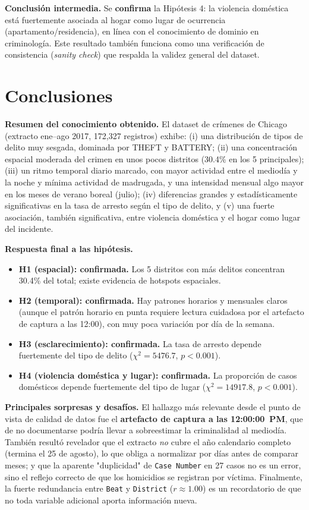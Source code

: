 \documentclass[11pt,a4paper]{article}
\begin{document}
\textbf{Conclusión intermedia.} Se \textbf{confirma} la Hipótesis 4: la
violencia doméstica está fuertemente asociada al hogar como lugar de
ocurrencia (apartamento/residencia), en línea con el conocimiento de
dominio en criminología. Este resultado también funciona como una
verificación de consistencia (\textit{sanity check}) que respalda la
validez general del dataset.

\section{Conclusiones}

\textbf{Resumen del conocimiento obtenido.} El dataset de crímenes de
Chicago (extracto ene--ago 2017, 172,327 registros) exhibe: (i) una
distribución de tipos de delito muy sesgada, dominada por THEFT y BATTERY;
(ii) una concentración espacial moderada del crimen en unos pocos distritos
(30.4\% en los 5 principales); (iii) un ritmo temporal diario marcado, con
mayor actividad entre el mediodía y la noche y mínima actividad de
madrugada, y una intensidad mensual algo mayor en los meses de verano
boreal (julio); (iv) diferencias grandes y estadísticamente significativas
en la tasa de arresto según el tipo de delito, y (v) una fuerte asociación,
también significativa, entre violencia doméstica y el hogar como lugar del
incidente.

\textbf{Respuesta final a las hipótesis.}
\begin{itemize}
    \item \textbf{H1 (espacial): confirmada.} Los 5 distritos con más
    delitos concentran 30.4\% del total; existe evidencia de hotspots
    espaciales.
    \item \textbf{H2 (temporal): confirmada.} Hay patrones horarios y
    mensuales claros (aunque el patrón horario en punta requiere lectura
    cuidadosa por el artefacto de captura a las 12:00), con muy poca
    variación por día de la semana.
    \item \textbf{H3 (esclarecimiento): confirmada.} La tasa de arresto
    depende fuertemente del tipo de delito ($\chi^2=5476.7$, $p<0.001$).
    \item \textbf{H4 (violencia doméstica y lugar): confirmada.} La
    proporción de casos domésticos depende fuertemente del tipo de lugar
    ($\chi^2=14917.8$, $p<0.001$).
\end{itemize}

\textbf{Principales sorpresas y desafíos.} El hallazgo más relevante desde
el punto de vista de calidad de datos fue el \textbf{artefacto de captura a
las 12:00:00~PM}, que de no documentarse podría llevar a sobreestimar la
criminalidad al mediodía. También resultó revelador que el extracto
\emph{no} cubre el año calendario completo (termina el 25 de agosto), lo
que obliga a normalizar por días antes de comparar meses; y que la
aparente "duplicidad" de \texttt{Case Number} en 27 casos no es un error,
sino el reflejo correcto de que los homicidios se registran por víctima.
Finalmente, la fuerte redundancia entre \texttt{Beat} y \texttt{District}
($r\approx 1.00$) es un recordatorio de que no toda variable adicional
aporta información nueva.
\end{document}
